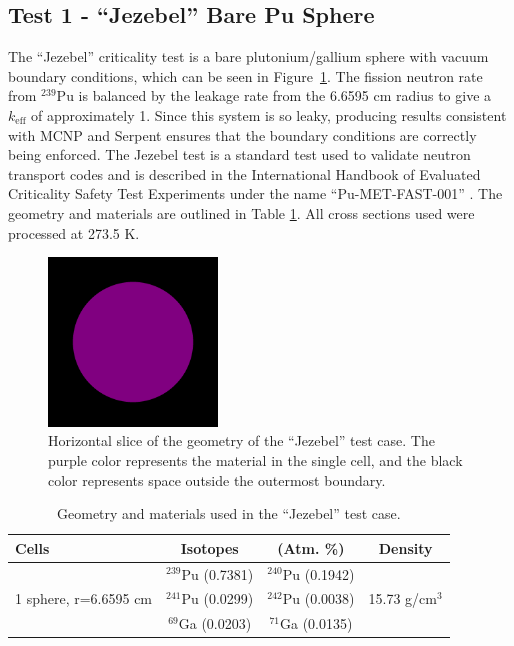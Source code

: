 \documentclass[preprint,12pt]{elsarticle}
\begin{document}
\newpage
\subsection{Test 1 - ``Jezebel'' Bare Pu Sphere}

The ``Jezebel'' criticality test is a bare plutonium/gallium sphere with vacuum boundary conditions, which can be seen in Figure~\ref{jezebel_geom_pic}.  The fission neutron rate from $^{239}$Pu is balanced by the leakage rate from the 6.6595 cm radius to give a $k_\mathrm{eff}$ of approximately 1.  Since this system is so leaky, producing results consistent with MCNP and Serpent ensures that the boundary conditions are correctly being enforced.  The Jezebel test is a standard test used to validate neutron transport codes and is described in the International Handbook of Evaluated Criticality Safety Test Experiments under the name ``Pu-MET-FAST-001'' \cite{bench_handbook}.  The geometry and materials are outlined in Table \ref{jezebel_geom}.  All cross sections used were processed at 273.5 K.

\begin{figure}[h!] 
  \centering
    \includegraphics[width=0.4\textwidth]{graphics/jezebel-xy.png}
     \caption{ Horizontal slice of the geometry of the ``Jezebel'' test case.  The purple color represents the material in the single cell, and the black color represents space outside the outermost boundary. \label{jezebel_geom_pic} }
\end{figure}

\begin{table}[h]
\centering
\caption{Geometry and materials used in the ``Jezebel'' test case.}
\label{jezebel_geom}
\begin{tabular}{| l | c  c | c |}
\hline
Cells & Isotopes & (Atm. \%)& Density \\
\hline
\multirow{3}{*}{1 sphere, r=6.6595 cm }  &  $^{239}$Pu (0.7381)    &    $^{240}$Pu (0.1942)     &  \multirow{3}{*}{15.73 g/cm$^3$} \\
                                         &  $^{241}$Pu (0.0299)    &     $^{242}$Pu (0.0038)    &   \\
                                         &  $^{69}$Ga  (0.0203)    &     $^{71}$Ga  (0.0135)    &   \\
\hline
\end{tabular}
\end{table}
\end{document}
